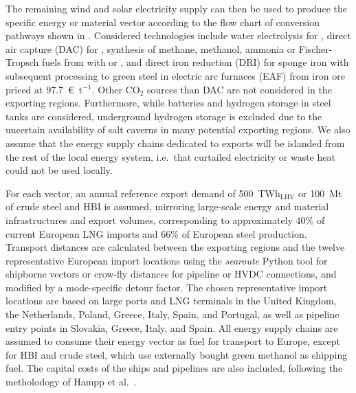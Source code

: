 
The remaining wind and solar electricity supply can then be used to produce the
specific energy or material vector according to the flow chart of conversion
pathways shown in . Considered technologies
include water electrolysis for , direct air capture (DAC) for ,
synthesis of methane, methanol, ammonia or Fischer-Tropsch fuels from 
with  or , and  direct iron reduction (DRI) for sponge
iron with subsequent processing to green steel in electric arc furnaces (EAF)
from iron ore priced at
97.7~\euro{}~t$^{-1}$.\cite{missionpossiblepartnershipSteelSectorTransition2022}
Other CO$_2$ sources than DAC are not considered in the exporting regions.
Furthermore, while batteries and hydrogen storage in steel tanks are considered,
underground hydrogen storage is excluded due to the uncertain availability of
salt caverns in many potential exporting
regions.\cite{hevinUndergroundStorageHydrogen2019,hydrogentcp-task42UndergroundHydrogenStorage2023}
We also assume that the energy supply chains dedicated to exports will be
islanded from the rest of the local energy system, i.e.~that curtailed
electricity or waste heat could not be used locally.

For each vector, an annual reference export demand of 500~TWh$_\text{LHV}$ or
100~Mt of crude steel and HBI is assumed, mirroring large-scale energy and material
infrastructures and export volumes, corresponding to approximately 40\% of
current European LNG
imports\cite{instituteforenergyeconomicsandfinancialanalysisEuropeanLNG2023} and
66\% of European steel
production.\cite{eurofer-theeuropeansteelassociationEuropeanSteel2023} Transport
distances are calculated between the exporting regions and the twelve
representative European import locations using the \textit{searoute} Python
tool\cite{haliliSeaRoutePython2024} for shipborne vectors or crow-fly distances
for pipeline or HVDC connections, and modified by a mode-specific detour factor.
The chosen representative import locations are based on large ports and LNG
terminals in the United Kingdom, the Netherlands, Poland, Greece, Italy, Spain,
and Portugal, as well as pipeline entry points in Slovakia, Greece, Italy, and
Spain. All energy supply chains are assumed to consume their energy vector as
fuel for transport to Europe, except for HBI and crude steel, which use externally
bought green methanol as shipping fuel. The capital costs of the ships and
pipelines are also included, following the metholodogy of Hampp et
al.~\cite{hamppImportOptions2023}.


